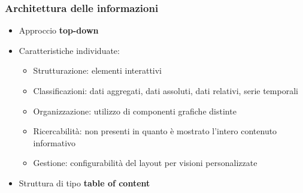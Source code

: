 \documentclass[handout]{beamer}
\begin{document}
		\begin{frame}
			\frametitle{Architettura delle informazioni}
			\begin{itemize}[<+->]
				\item Approccio \textbf{top-down}\\
				\item Caratteristiche individuate:\\
					\begin{itemize}[<+->]
						\item Strutturazione: elementi interattivi\\
						\item Classificazioni: dati aggregati, dati assoluti, dati relativi, serie temporali\\
						\item Organizzazione: utilizzo di componenti grafiche distinte\\
						\item Ricercabilità: non presenti in quanto è mostrato l'intero contenuto informativo\\
						\item Gestione: configurabilità del layout per visioni personalizzate\\
					\end{itemize}
				\item Struttura di tipo \textbf{table of content}\\
			\end{itemize}
		\end{frame}
\end{document}
